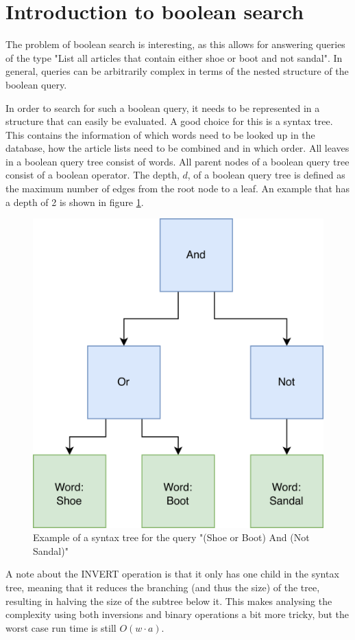 \section{Introduction to boolean search}

The problem of boolean search is interesting, as this allows for answering queries of the type "List all articles that contain either shoe or boot and not sandal". In general, queries can be arbitrarily complex in terms of the nested structure of the boolean query. 

In order to search for such a boolean query, it needs to be represented in a structure that can easily be evaluated. A good choice for this is a syntax tree. This contains the information of which words need to be looked up in the database, how the article lists need to be combined and in which order. All leaves in a boolean query tree consist of words. All parent nodes of a boolean query tree consist of a boolean operator. The depth, $d$, of a boolean query tree is defined as the maximum number of edges from the root node to a leaf. An example that has a depth of 2 is shown in figure \ref{fig:bool-st-example}.

\begin{figure}[ht!]
    \centering
    \includegraphics[width=.5\textwidth]{LaTeX/Figures/BooleanST.png}
    \caption{Example of a syntax tree for the query "(Shoe or Boot) And (Not Sandal)"}
    \label{fig:bool-st-example}
\end{figure}

A note about the INVERT operation is that it only has one child in the syntax tree, meaning that it reduces the branching (and thus the size) of the tree, resulting in halving the size of the subtree below it. This makes analysing the complexity using both inversions and binary operations a bit more tricky, but the worst case run time is still $O(w\cdot a)$. 

